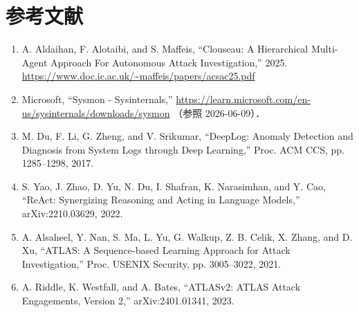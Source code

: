 

\section*{参考文献}

\begin{enumerate}
    \item A. Aldaihan, F. Alotaibi, and S. Maffeis,
    ``Clouseau: A Hierarchical Multi-Agent Approach For Autonomous Attack Investigation,''
    2025. \url{https://www.doc.ic.ac.uk/~maffeis/papers/acsac25.pdf}

    \item Microsoft,
    ``Sysmon - Sysinternals,''
    \url{https://learn.microsoft.com/en-us/sysinternals/downloads/sysmon}
    （参照 2026-06-09）．

    \item M. Du, F. Li, G. Zheng, and V. Srikumar,
    ``DeepLog: Anomaly Detection and Diagnosis from System Logs through Deep Learning,''
    Proc. ACM CCS, pp. 1285--1298, 2017.

    \item S. Yao, J. Zhao, D. Yu, N. Du, I. Shafran, K. Narasimhan, and Y. Cao,
    ``ReAct: Synergizing Reasoning and Acting in Language Models,''
    arXiv:2210.03629, 2022.

    \item A. Alsaheel, Y. Nan, S. Ma, L. Yu, G. Walkup, Z. B. Celik, X. Zhang, and D. Xu,
    ``ATLAS: A Sequence-based Learning Approach for Attack Investigation,''
    Proc. USENIX Security, pp. 3005--3022, 2021.

    \item A. Riddle, K. Westfall, and A. Bates,
    ``ATLASv2: ATLAS Attack Engagements, Version 2,''
    arXiv:2401.01341, 2023.
\end{enumerate}


